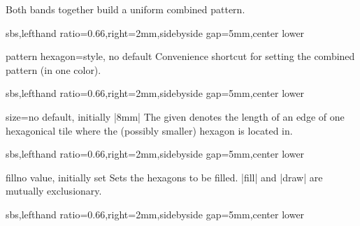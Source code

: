 \documentclass[a4paper,11pt]{article}
\begin{document}
Both bands together build a uniform combined pattern.

\begin{dispExample*}{sbs,lefthand ratio=0.66,right=2mm,sidebyside gap=5mm,center lower}
\end{dispExample*}

\begin{docTikzKey}{pattern hexagon}{=}{style, no default}
  Convenience shortcut for setting the combined pattern (in one color).

\begin{dispExample*}{sbs,lefthand ratio=0.66,right=2mm,sidebyside gap=5mm,center lower}
\end{dispExample*}
\end{docTikzKey}

\clearpage

\begin{docPatternKey}{size}{=}{no default, initially |8mm|}
  The given  denotes the length of an edge of one hexagonical tile
  where the (possibly smaller) hexagon is located in.
\begin{dispExample*}{sbs,lefthand ratio=0.66,right=2mm,sidebyside gap=5mm,center lower}
\end{dispExample*}
\end{docPatternKey}



\begin{docPatternKey}{fill}{}{no value, initially set}
  Sets the hexagons to be filled. |fill| and |draw| are mutually exclusionary.
\begin{dispExample*}{sbs,lefthand ratio=0.66,right=2mm,sidebyside gap=5mm,center lower}
\end{dispExample*}
\end{docPatternKey}
\end{document}
